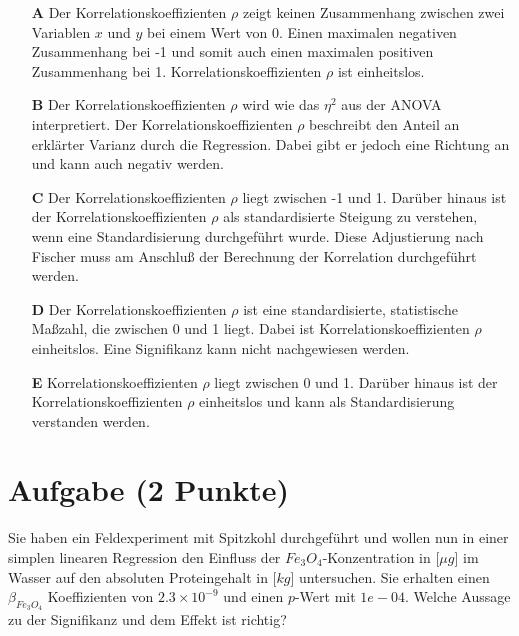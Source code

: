 \documentclass[a4paper, 9pt]{scrartcl}\usepackage[]{graphicx}\usepackage[]{xcolor}
\begin{document}
\begin{enumerate}
\item [\textbf{A} \msquare] Der Korrelationskoeffizienten $\rho$ zeigt keinen Zusammenhang zwischen zwei Variablen $x$ und $y$ bei einem Wert von 0. Einen maximalen negativen Zusammenhang bei -1 und somit auch einen maximalen positiven Zusammenhang bei 1. Korrelationskoeffizienten $\rho$ ist einheitslos.
\item [\textbf{B} \msquare] Der Korrelationskoeffizienten $\rho$ wird wie das $\eta^2$ aus der ANOVA interpretiert. Der Korrelationskoeffizienten $\rho$ beschreibt den Anteil an erklärter Varianz durch die Regression. Dabei gibt er jedoch eine Richtung an und kann auch negativ werden.
\item [\textbf{C} \msquare] Der Korrelationskoeffizienten $\rho$ liegt zwischen -1 und 1. Darüber hinaus ist der Korrelationskoeffizienten $\rho$ als standardisierte Steigung zu verstehen, wenn eine Standardisierung durchgeführt wurde. Diese Adjustierung nach Fischer muss am Anschluß der Berechnung der Korrelation durchgeführt werden.
\item [\textbf{D} \msquare] Der Korrelationskoeffizienten $\rho$ ist eine standardisierte, statistische Maßzahl, die zwischen 0 und 1 liegt. Dabei ist Korrelationskoeffizienten $\rho$ einheitslos. Eine Signifikanz kann nicht nachgewiesen werden.
\item [\textbf{E} \msquare] Korrelationskoeffizienten $\rho$ liegt zwischen 0 und 1. Darüber hinaus ist der Korrelationskoeffizienten $\rho$ einheitslos und kann als Standardisierung verstanden werden.
\end{enumerate}

\section{Aufgabe \hfill (2 Punkte)}



Sie haben ein Feldexperiment mit Spitzkohl durchgeführt und wollen nun in einer simplen linearen Regression den Einfluss der $Fe_3O_4$-Konzentration in [$\mu g$] im Wasser auf den absoluten Proteingehalt in [$kg$] untersuchen. Sie erhalten einen $\beta_{Fe_3O_4}$ Koeffizienten von $2.3\times 10^{-9}$ und einen $p$-Wert mit $1e-04$. Welche Aussage zu der Signifikanz und dem Effekt ist richtig?
\end{document}
